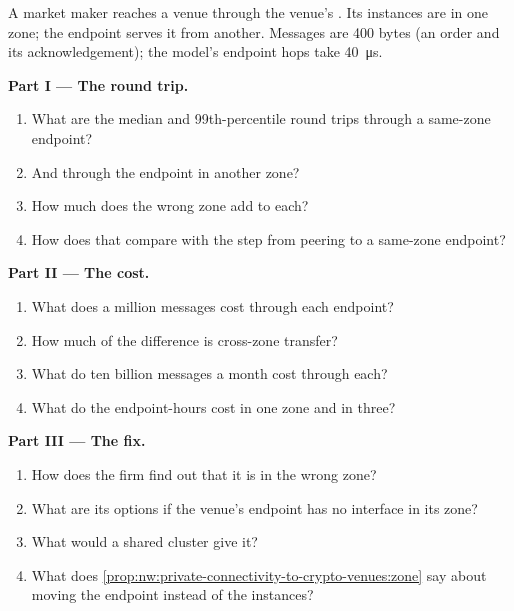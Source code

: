 \begin{problem}\label{pb:nw:private-connectivity-to-crypto-venues:1}
A market maker reaches a venue through the venue's . Its instances are in one zone; the endpoint serves it from another. Messages are
400 bytes (an order and its acknowledgement); the model's endpoint hops take \qty{40}{\micro\second}.

\medskip\noindent\textbf{Part I --- The round trip.}
\begin{enumerate}
\item What are the median and 99th-percentile round trips through a same-zone endpoint?
\item And through the endpoint in another zone?
\item How much does the wrong zone add to each?
\item How does that compare with the step from peering to a same-zone endpoint?
\end{enumerate}

\medskip\noindent\textbf{Part II --- The cost.}
\begin{enumerate}[resume]
\item What does a million messages cost through each endpoint?
\item How much of the difference is cross-zone transfer?
\item What do ten billion messages a month cost through each?
\item What do the endpoint-hours cost in one zone and in three?
\end{enumerate}

\medskip\noindent\textbf{Part III --- The fix.}
\begin{enumerate}[resume]
\item How does the firm find out that it is in the wrong zone?
\item What are its options if the venue's endpoint has no interface in its zone?
\item What would a shared cluster  give it?
\item What does \cref{prop:nw:private-connectivity-to-crypto-venues:zone} say about moving the endpoint instead of the instances?
\end{enumerate}


\end{problem}
